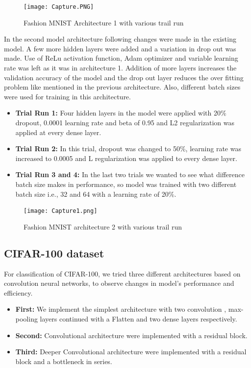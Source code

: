 \documentclass{article}
\begin{document}
\begin{figure}[H]
    \centering
    \texttt{[image: Capture.PNG]}
    \caption{Fashion MNIST Architecture 1 with various trail run}
    \label{fig:compute}
\end{figure}

In the second model architecture following changes were made in the existing model. A few more hidden layers were added and a variation in drop out was made. Use of ReLu activation function, Adam optimizer and variable learning rate was left as it was in architecture 1. Addition of more layers increases the validation accuracy of the model and the drop out layer reduces the over fitting problem like mentioned in the previous architecture. Also, different batch sizes were used for training in this architecture.

\begin{itemize}
    \item \textbf{Trial Run 1:} Four hidden layers in the model were applied with 20\% dropout, 0.0001 learning rate and beta of 0.95 and L2 regularization was applied at every dense layer. 
    \item \textbf{Trial Run 2:} In this trial, dropout was changed to 50\%, learning rate was increased to 0.0005 and L regularization was applied to every dense layer.
    \item \textbf{Trial Run 3 and 4:} In the last two trials we wanted to see what difference batch size makes in performance, so model was trained with two different batch size i.e., 32 and 64 with a learning rate of 20\%.
\end{itemize}

\begin{figure}[H]
    \centering
    \texttt{[image: Capture1.png]}
    \caption{Fashion MNIST architecture 2 with various trail run}
    \label{fig:MNISTAc2}
\end{figure}

\subsection{CIFAR-100 dataset}

For classification of CIFAR-100, we tried three different architectures based on convolution neural networks, to observe changes in model's performance and efficiency.

\begin{itemize}
    \item \textbf{First:} We implement the simplest architecture with two convolution , max-pooling layers continued with a Flatten and two dense layers respectively.
    \item \textbf{Second:} Convolutional architecture were implemented with a residual block.
    \item \textbf{Third:} Deeper Convolutional architecture were implemented with a residual block and a bottleneck in series. 
\end{itemize}
\end{document}
